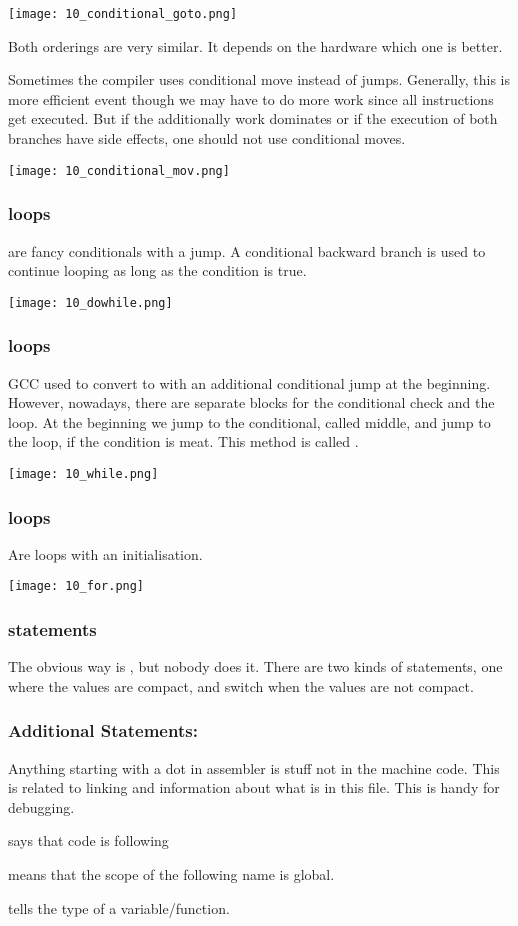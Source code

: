 \texttt{[image: 10\_conditional\_goto.png]}

Both orderings are very similar. It depends on the hardware which one is better.

Sometimes the compiler uses conditional move  instead of jumps. Generally, this is more efficient event though we may have to do more work since all instructions get executed. But if the additionally work dominates or if the execution of both branches have side effects, one should not use conditional moves.

\texttt{[image: 10\_conditional\_mov.png]}

\subsubsection{ loops}
 are fancy conditionals with a jump. A conditional backward branch is used to continue looping as long as the condition is true.

\texttt{[image: 10\_dowhile.png]}

\subsubsection{ loops}
GCC used to convert  to  with an additional conditional jump at the beginning. However, nowadays, there are separate blocks for the conditional check and the loop. At the beginning we jump to the conditional, called middle, and jump to the loop, if the condition is meat. This method is called .

\texttt{[image: 10\_while.png]}

\subsubsection{ loops}
Are  loops with an initialisation.

\texttt{[image: 10\_for.png]}

\subsubsection{ statements}
The obvious way is , but nobody does it. There are two kinds of statements, one where the values are compact, and switch when the values are not compact.

\subsubsection{Additional Statements:}
Anything starting with a dot in assembler is stuff not in the machine code. This is related to linking and information about what is in this file. This is handy for debugging.

 says that code is following

 means that the scope of the following name is global.

 tells the type of a variable/function.

